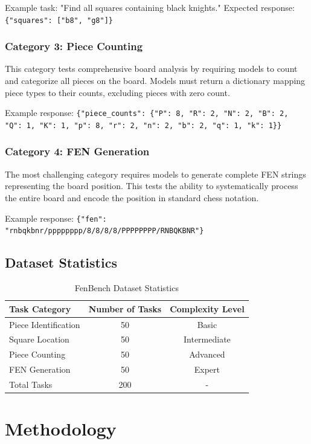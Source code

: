 \documentclass{article}
\begin{document}
Example task: "Find all squares containing black knights." Expected response: \texttt{\{"squares": ["b8", "g8"]\}}

\subsubsection{Category 3: Piece Counting}
This category tests comprehensive board analysis by requiring models to count and categorize all pieces on the board. Models must return a dictionary mapping piece types to their counts, excluding pieces with zero count.

Example response: \texttt{\{"piece\_counts": \{"P": 8, "R": 2, "N": 2, "B": 2, "Q": 1, "K": 1, "p": 8, "r": 2, "n": 2, "b": 2, "q": 1, "k": 1\}\}}

\subsubsection{Category 4: FEN Generation}
The most challenging category requires models to generate complete FEN strings representing the board position. This tests the ability to systematically process the entire board and encode the position in standard chess notation.

Example response: \texttt{\{"fen": "rnbqkbnr/pppppppp/8/8/8/8/PPPPPPPP/RNBQKBNR"\}}

\subsection{Dataset Statistics}

\begin{table}[h]
\centering
\caption{FenBench Dataset Statistics}
\label{tab:dataset_stats}
\begin{tabular}{lcc}
\toprule
Task Category & Number of Tasks & Complexity Level \\
\midrule
Piece Identification & 50 & Basic \\
Square Location & 50 & Intermediate \\
Piece Counting & 50 & Advanced \\
FEN Generation & 50 & Expert \\
\midrule
Total Tasks & 200 & - \\
\bottomrule
\end{tabular}
\end{table}

\section{Methodology}
\end{document}
